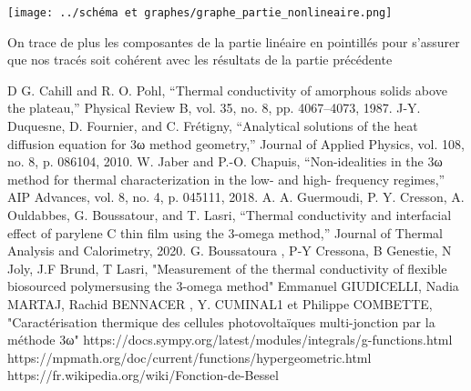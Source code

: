\documentclass[10pt,a4paper]{report}
\begin{document}
\begin{center}
\texttt{[image: ../schéma et graphes/graphe\_partie\_nonlineaire.png]} 
\end{center}
On trace de plus les composantes de la partie linéaire en pointillés pour s'assurer que nos tracés soit cohérent avec les résultats de la partie précédente
\begin{thebibliography}
D G. Cahill and R. O. Pohl, “Thermal conductivity of amorphous solids above the plateau,” Physical Review B,
vol. 35, no. 8, pp. 4067–4073, 1987.
\newline
\newline
J-Y. Duquesne, D. Fournier, and C. Frétigny, “Analytical solutions of the heat diffusion equation for 3ω method
geometry,” Journal of Applied Physics, vol. 108, no. 8, p. 086104, 2010.
\newline
\newline
 W. Jaber and P.-O. Chapuis, “Non-idealities in the 3ω method for thermal characterization in the low- and high-
frequency regimes,” AIP Advances, vol. 8, no. 4, p. 045111, 2018.
\newline
\newline
A. A. Guermoudi, P. Y. Cresson, A. Ouldabbes, G. Boussatour, and T. Lasri, “Thermal conductivity and
interfacial effect of parylene C thin film using the 3-omega method,” Journal of Thermal Analysis and
Calorimetry, 2020.
\newline
\newline
G. Boussatoura , P-Y Cressona, B Genestie, N Joly, J.F Brund, T Lasri, "Measurement of the thermal conductivity of flexible biosourced polymersusing the 3-omega method"
\newline
\newline
Emmanuel GIUDICELLI, Nadia MARTAJ, Rachid BENNACER , Y. CUMINAL1 et Philippe COMBETTE, "Caractérisation thermique des cellules photovoltaïques multi-jonction par la méthode 3ω"
\newline
\newline
https://docs.sympy.org/latest/modules/integrals/g-functions.html
\newline
\newline
https://mpmath.org/doc/current/functions/hypergeometric.html
\newline
\newline
https://fr.wikipedia.org/wiki/Fonction-de-Bessel
\end{thebibliography}
\end{document}
